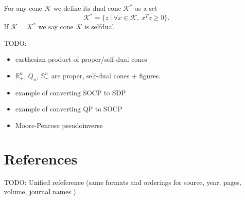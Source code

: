 \documentclass[12pt]{book}
\theoremstyle{definition}
\begin{document}
\begin{appendix}
\label{defDualCone}
For any cone $\mathcal{K}$ we define its dual cone $\mathcal{K}^*$ as a set
\begin{equation}
\mathcal{K}^* = \{z\ |\ \forall x\in\mathcal{K}, \ x^Tz\geq 0\}.
\end{equation}
If  $\mathcal{K} =  \mathcal{K}^*$ we say cone $\mathcal{K}$ is selfdual.

TODO: 
\begin{itemize}
\item carthesian product of proper/self-dual cones
\item $\mathbb{R}^n_+$, $Q_n$, $ \mathbb{S}^n_+$ are proper, self-dual cones + figures.
\item example of converting SOCP to SDP
\item example of converting QP to SOCP
\item Moore-Penrose pseudoinverse

\end{itemize}


\end{appendix}

\chapter*{References}

TODO: Unified refeference (same formats and orderings for source, year, pages, volume, journal names )
\end{document}
